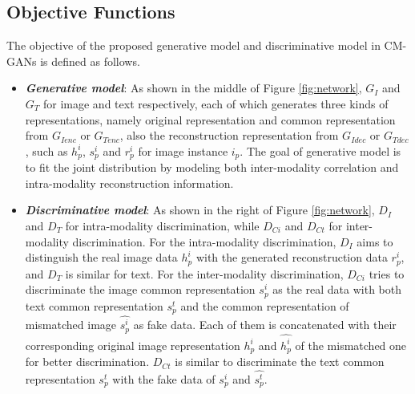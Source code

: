 \documentclass[journal]{IEEEtran}
\begin{document}
\subsection{Objective Functions}

The objective of the proposed generative model and discriminative model in CM-GANs is defined as follows.

\begin{itemize}
	\item \textit{\textbf{Generative model}}: As shown in the middle of Figure \ref{fig:network}, $G_I$ and $G_T$ for image and text respectively, each of which generates three kinds of representations, namely original representation and common representation from $G_{Ienc}$ or $G_{Tenc}$, also the reconstruction representation from $G_{Idec}$ or $G_{Tdec}$, such as $h_p^i$, $s_p^i$ and $r_p^i$ for image instance $i_p$. The goal of generative model is to fit the joint distribution by modeling both inter-modality correlation and intra-modality reconstruction information.
	\item \textit{\textbf{Discriminative model}}: As shown in the right of Figure \ref{fig:network}, $D_I$ and $D_T$ for intra-modality discrimination, while $D_{Ci}$ and $D_{Ct}$ for inter-modality discrimination. For the intra-modality discrimination, $D_I$ aims to distinguish the real image data $h_p^i$ with the generated reconstruction data $r_p^i$, and $D_T$ is similar for text. For the inter-modality discrimination, $D_{Ci}$ tries to discriminate the image common representation $s_p^i$ as the real data with both text common representation $s_p^t$ and the common representation of mismatched image $\hat{s_p^i}$ as fake data. Each of them is concatenated with their corresponding original image representation $h_p^i$ and $\hat{h_p^i}$ of the mismatched one for better discrimination. $D_{Ct}$ is similar to discriminate the text common representation $s_p^t$ with the fake data of $s_p^i$ and $\hat{s_p^t}$.
\end{itemize}
\end{document}
